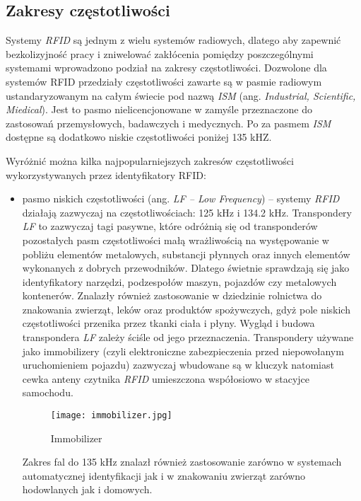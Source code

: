 \begin{itemize}
\begin{itemize}
\newpage

\section{Zakresy częstotliwości}

Systemy \emph{RFID} są jednym z wielu systemów radiowych, dlatego aby zapewnić bezkolizyjność pracy i zniwelować zakłócenia pomiędzy poszczególnymi systemami wprowadzono podział na zakresy częstotliwości.  Dozwolone dla systemów RFID przedziały częstotliwości zawarte są w pasmie radiowym ustandaryzowanym na całym świecie pod nazwą \emph{ISM} (ang. \emph{Industrial, Scientific, Miedical}). Jest to pasmo nielicencjonowane w zamyśle przeznaczone do zastosowań przemysłowych, badawczych i medycznych. Po za pasmem \emph{ISM} dostępne są dodatkowo niskie częstotliwości poniżej 135 kHZ.

Wyróżnić można kilka najpopularniejszych zakresów częstotliwości wykorzystywanych przez identyfikatory RFID:

\begin{itemize}\setlength{\itemsep}{0pt}
	\item pasmo niskich częstotliwości (ang. \emph {LF – Low Frequency}) – systemy \emph{RFID} działają zazwyczaj na częstotliwościach: 125 kHz i 134.2 kHz.
Transpondery \emph{LF} to zazwyczaj tagi pasywne, które odróżnią się od  transponderów pozostałych pasm częstotliwości małą wrażliwością na występowanie w pobliżu elementów metalowych, substancji płynnych oraz innych elementów wykonanych z dobrych przewodników. Dlatego świetnie sprawdzają się jako identyfikatory narzędzi, podzespołów maszyn, pojazdów czy metalowych kontenerów. Znalazły również zastosowanie w dziedzinie rolnictwa do znakowania zwierząt, leków oraz produktów spożywczych, gdyż pole niskich częstotliwości przenika przez tkanki ciała i płyny.
Wygląd i budowa transpondera \emph{LF} zależy ściśle od jego przeznaczenia. Transpondery używane jako immobilizery (czyli elektroniczne zabezpieczenia przed niepowołanym uruchomieniem pojazdu) zazwyczaj wbudowane są w kluczyk natomiast cewka anteny czytnika \emph{RFID} umieszczona współosiowo w stacyjce samochodu.
   
	\begin{figure}[h!]
	\centering
	    \texttt{[image: immobilizer.jpg]}
	    \caption{Immobilizer}
	\end{figure}

	\newpage

	Zakres fal do 135 kHz znalazł również zastosowanie zarówno w systemach automatycznej identyfikacji jak i w znakowaniu zwierząt  zarówno hodowlanych jak i domowych.


\end{itemize}
\end{itemize}
\end{itemize}
